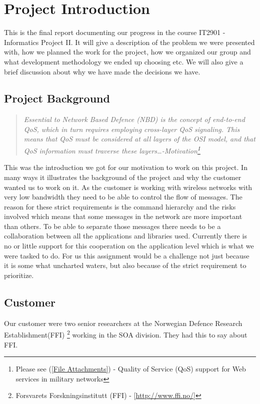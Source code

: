 \section{Project Introduction}\label{Project Introduction}
    This is the final report documenting our progress in the course IT2901 - Informatics Project II. It will give a description of the problem we were presented with, how we planned the work for the project, how we organized our group and what development methodology we ended up choosing etc. We will also give a brief discussion about why we have made the decisions we have.
    
    \subsection{Project Background}\label{Project Background}
    \begin{quotation}
    \em Essential to Network Based Defence (NBD) is the concept of end-to-end QoS, which in turn requires employing cross-layer QoS signaling. This means that QoS must be considered at all layers of the OSI model, and that QoS information must traverse these layers\ldots \textnormal{-Motivation\footnote{Please see (\ref{File Attachments}) - Quality of Service (QoS) support for Web services in military networks}}
    \end{quotation}
    This was the introduction we got for our motivation to work on this project. In many ways it illustrates the background of the project and why the customer wanted us to work on it. As the customer is working with wireless networks with very low bandwidth they need to be able to control the flow of messages. The reason for these strict requirements is the command hierarchy and the risks involved which means that some messages in the network are more important than others. To be able to separate those messages there needs to be a collaboration between all the applications and libraries used. Currently there is no or little support for this cooperation on the application level which is what we were tasked to do. For us this assignment would be a challenge not just because it is some what uncharted waters, but also because of the strict requirement to prioritize.

    \subsection{Customer}\label{Customer}
    Our customer were two senior researchers at the Norwegian Defence Research Establishment(FFI)    \footnote{Forsvarets Forskningsinstitutt (FFI) - [\url{http://www.ffi.no/}]} working in the SOA division. They had this to say about FFI.

